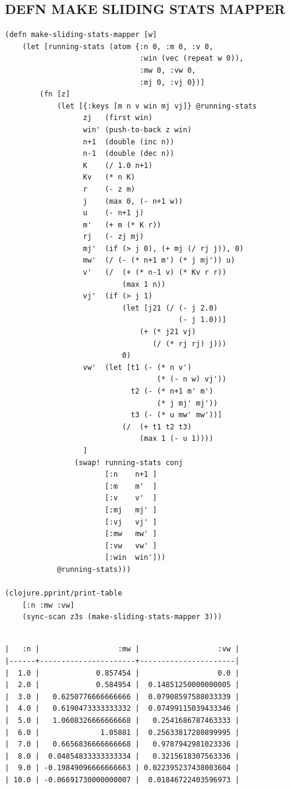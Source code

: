 \documentclass[10pt,oneside,x11names]{article}
\begin{document}
\subsection{DEFN MAKE SLIDING STATS MAPPER}
\label{sec:org245efda}

\begin{verbatim}
(defn make-sliding-stats-mapper [w]
    (let [running-stats (atom {:n 0, :m 0, :v 0,
                               :win (vec (repeat w 0)),
                               :mw 0, :vw 0,
                               :mj 0, :vj 0})]
        (fn [z]
            (let [{:keys [m n v win mj vj]} @running-stats
                  zj   (first win)
                  win' (push-to-back z win)
                  n+1  (double (inc n))
                  n-1  (double (dec n))
                  K    (/ 1.0 n+1)
                  Kv   (* n K)
                  r    (- z m)
                  j    (max 0, (- n+1 w))
                  u    (- n+1 j)
                  m'   (+ m (* K r))
                  rj   (- zj mj)
                  mj'  (if (> j 0), (+ mj (/ rj j)), 0)
                  mw'  (/ (- (* n+1 m') (* j mj')) u)
                  v'   (/  (+ (* n-1 v) (* Kv r r))
                           (max 1 n))
                  vj'  (if (> j 1)
                           (let [j21 (/ (- j 2.0)
                                        (- j 1.0))]
                               (+ (* j21 vj)
                                  (/ (* rj rj) j)))
                           0)
                  vw'  (let [t1 (- (* n v')
                                   (* (- n w) vj'))
                             t2 (- (* n+1 m' m')
                                   (* j mj' mj'))
                             t3 (- (* u mw' mw'))]
                           (/  (+ t1 t2 t3)
                               (max 1 (- u 1))))
                  ]
                (swap! running-stats conj
                       [:n    n+1 ]
                       [:m    m'  ]
                       [:v    v'  ]
                       [:mj   mj' ]
                       [:vj   vj' ]
                       [:mw   mw' ]
                       [:vw   vw' ]
                       [:win  win']))
            @running-stats)))

(clojure.pprint/print-table
    [:n :mw :vw]
    (sync-scan z3s (make-sliding-stats-mapper 3)))
\end{verbatim}

\begin{verbatim}

|   :n |                  :mw |                  :vw |
|------+----------------------+----------------------|
|  1.0 |             0.857454 |                  0.0 |
|  2.0 |             0.584954 |  0.14851250000000005 |
|  3.0 |   0.6250776666666666 |  0.07908597588033339 |
|  4.0 |   0.6190473333333332 |  0.07499115039433346 |
|  5.0 |   1.0608326666666668 |   0.2541686787463333 |
|  6.0 |              1.05881 |  0.25633817280899995 |
|  7.0 |   0.6656836666666668 |   0.9787942981023336 |
|  8.0 |  0.04854833333333334 |   0.3215618307563336 |
|  9.0 | -0.19849096666666663 | 0.022395237438003604 |
| 10.0 | -0.06691730000000007 |  0.01846722403596973 |
\end{verbatim}
\end{document}

